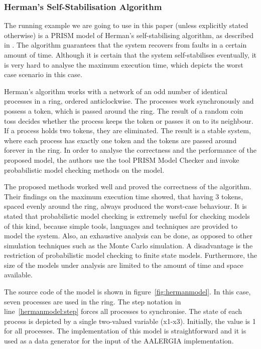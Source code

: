 \documentclass[
a4paper,
12pt
]{scrartcl}
\begin{document}
\subsubsection{Herman's Self-Stabilisation Algorithm}
The running example we are going to use in this paper (unless explicitly stated otherwise) is a PRISM model of Herman's self-stabilising algorithm, as described in \cite{Kwiatkowska.2012}. The algorithm guarantees that the system recovers from faults in a certain amount of time. Although it is certain that the system self-stabilises eventually, it is very hard to analyse the maximum execution time, which depicts the worst case scenario in this case.
\par Herman's algorithm works with a network of an odd number of identical processes in a ring, ordered anticlockwise. The processes work synchronously and possess a token, which is passed around the ring. The result of a random coin toss decides whether the process keeps the token or passes it on to its neighbour. If a process holds two tokens, they are eliminated. The result is a stable system, where each process has exactly one token and the tokens are passed around forever in the ring. In order to analyse the correctness and the performance of the proposed model, the authors use the tool PRISM Model Checker and invoke probabilistic model checking methods on the model.
\par The proposed methods worked well and proved the correctness of the algorithm. Their findings on the maximum execution time showed, that having 3 tokens, spaced evenly around the ring, always produced the worst-case behaviour. It is stated that probabilistic model checking is extremely useful for checking models of this kind, because simple tools, languages and techniques are provided to model the system. Also, an exhaustive analysis can be done, as opposed to other simulation techniques such as the Monte Carlo simulation. A disadvantage is the restriction of probabilistic model checking to finite state models. Furthermore, the size of the models under analysis are limited to the amount of time and space available.
\par The source code of the model is shown in figure~\ref{fig:hermanmodel}. In this case, seven processes are used in the ring. The step notation in line~\ref{hermanmodel:step} forces all processes to synchronise. The state of each process is depicted by a single two-valued variable (x1-x3). Initially, the value is 1 for all processes. The implementation of this model is straightforward and it is used as a data generator for the input of the AALERGIA implementation.
\end{document}

